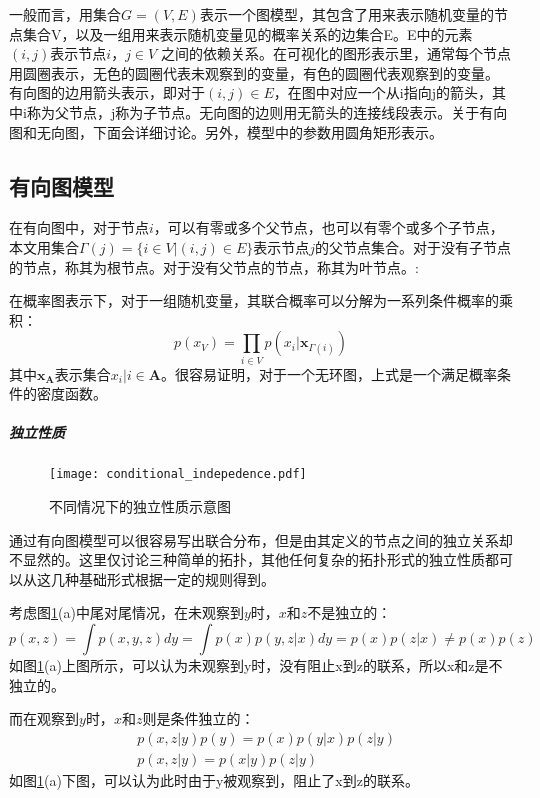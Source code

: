 一般而言，用集合$G = (V,E)$表示一个图模型，其包含了用来表示随机变量的节点集合V，以及一组用来表示随机变量见的概率关系的边集合E。E中的元素$(i,j)$表示节点$i，j \in V$ 之间的依赖关系。在可视化的图形表示里，通常每个节点用圆圈表示，无色的圆圈代表未观察到的变量，有色的圆圈代表观察到的变量。
有向图的边用箭头表示，即对于$(i,j) \in E$，在图中对应一个从i指向j的箭头，其中i称为父节点，j称为子节点。无向图的边则用无箭头的连接线段表示。关于有向图和无向图，下面会详细讨论。另外，模型中的参数用圆角矩形表示。

\subsection{有向图模型}
在有向图中，对于节点$i$，可以有零或多个父节点，也可以有零个或多个子节点，本文用集合$\Gamma(j) = \{i \in V| (i,j) \in E\} $表示节点$j$的父节点集合。对于没有子节点的节点，称其为根节点。对于没有父节点的节点，称其为叶节点。:

在概率图表示下，对于一组随机变量，其联合概率可以分解为一系列条件概率的乘积：
\begin{equation}
p(x_V) = \prod_{i \in V} p(x_i|{\bm x}_{\Gamma(i)})
\end{equation}
其中${\bm x}_{\bm A}$表示集合${x_i|i \in {\bm A}}$。很容易证明，对于一个无环图，上式是一个满足概率条件的密度函数。

\subparagraph{独立性质}
\begin{figure}
\texttt{[image: conditional\_indepedence.pdf]} 

  \caption{不同情况下的独立性质示意图} \label{fig:depedence}
\end{figure}
通过有向图模型可以很容易写出联合分布，但是由其定义的节点之间的独立关系却不显然的。这里仅讨论三种简单的拓扑，其他任何复杂的拓扑形式的独立性质都可以从这几种基础形式根据一定的规则得到。

考虑图\ref{fig:depedence}(a)中尾对尾情况，在未观察到$y$时，$x$和$z$不是独立的：
\begin{equation}
p(x,z) = \int p(x,y,z) dy = \int p(x)p(y,z|x) dy  = p(x)p(z|x) \neq p(x)p(z) 
\end{equation}
如图\ref{fig:depedence}(a)上图所示，可以认为未观察到y时，没有阻止x到z的联系，所以x和z是不独立的。

而在观察到$y$时，$x$和$z$则是条件独立的：
\begin{equation}
\begin{split}
&p(x,z|y)p(y) = p(x)p(y|x)p(z|y)\\
&p(x,z|y) = p(x|y)p(z|y)
\end{split} 
\end{equation}
如图\ref{fig:depedence}(a)下图，可以认为此时由于y被观察到，阻止了x到z的联系。

